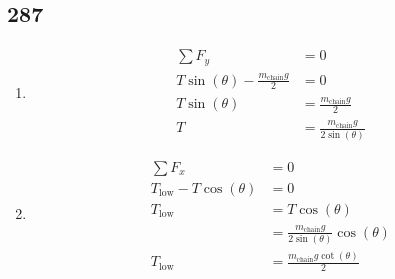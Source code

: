 \documentclass{article}
\begin{document}
\subsection{287}
\begin{enumerate}[label=\textbf{(\alph*)}]
	\item
		\begin{align*}
			\sum F_y & = 0 \\
			T\sin(\theta) - \frac{m_\text{chain}g}{2} & = 0 \\
			T\sin(\theta) & = \frac{m_\text{chain}g}{2} \\
			T & = \frac{m_\text{chain}g}{2\sin(\theta)}
		\end{align*}
	\item
		\begin{align*}
			\sum F_x & = 0 \\
			T_\text{low} - T\cos(\theta) & = 0 \\
			T_\text{low} & = T\cos(\theta) \\
						 & = \frac{m_\text{chain}g}{2\sin(\theta)}\cos(\theta) \\
			T_\text{low} & = \frac{m_\text{chain}{g}\cot(\theta)}{2}
		\end{align*}
\end{enumerate}
\end{document}

